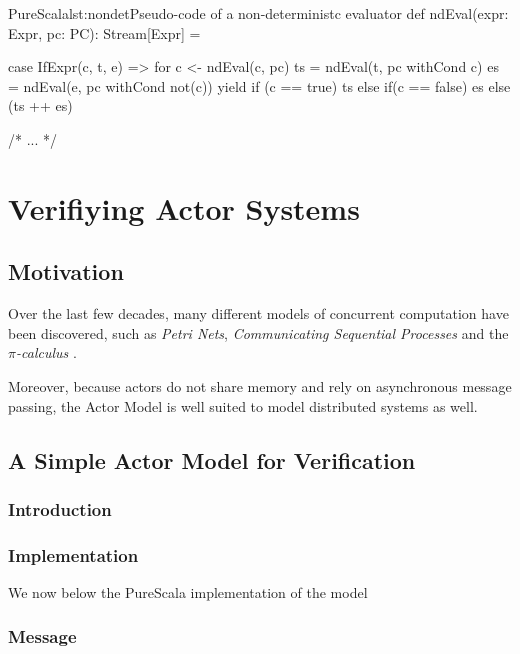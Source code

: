 \documentclass[a4paper,twoside]{article}
\begin{document}
\begin{Code}{PureScala}{lst:nondet}{Pseudo-code of a non-deterministc evaluator}
def ndEval(expr: Expr, pc: PC): Stream[Expr] = {
 case IfExpr(c, t, e) =>
  for {
    c  <- ndEval(c, pc)
    ts  = ndEval(t, pc withCond c)
    es  = ndEval(e, pc withCond not(c))
  } yield if (c == true) ts else if(c == false) es else (ts ++ es)

  /* ... */
}
\end{Code}


\clearpage
\section{Verifiying Actor Systems}
\label{actors}

\subsection{Motivation}

Over the last few decades, many different models of concurrent computation have been discovered, such as \textit{Petri Nets}, \textit{Communicating Sequential Processes} and the \textit{$\pi$-calculus} \cite{algebraicactors}. 

Moreover, because actors do not share memory and rely on asynchronous message passing, the Actor Model is well suited to model distributed systems as well.

\subsection{A Simple Actor Model for Verification}

\subsubsection{Introduction}

\subsubsection{Implementation}
\label{actor-impl}

We now below the PureScala implementation of the model 

\subsubsection*{Message}
\end{document}
